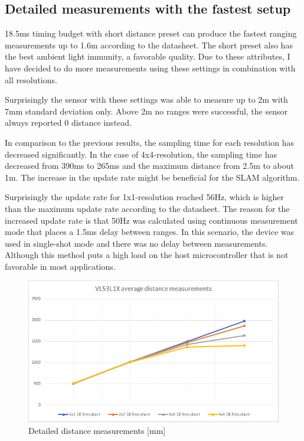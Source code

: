 \subsection{Detailed measurements with the fastest setup}
18.5ms timing budget with short distance preset can produce the fastest ranging measurements
up to 1.6m according to the datasheet. The short preset also has the best ambient light
immunity, a favorable quality. Due to these attributes, I have decided to do more measurements
using these settings in combination with all resolutions.

Surprisingly the sensor with these settings was able to measure up to 2m with 7mm
standard deviation only. Above 2m no ranges were successful, the sensor always reported 0 distance
instead.

In comparison to the previous results, the sampling time for each resolution has decreased
significantly. In the case of 4x4-resolution, the sampling time has decreased from 390ms to
265ms and the maximum distance from 2.5m to about 1m. The increase in the update rate might be
beneficial for the SLAM algorithm.

Surprisingly the update rate for 1x1-resolution reached 56Hz, which is higher than the
maximum update rate according to the datasheet. The reason for the increased update rate
is that 50Hz was calculated using continuous measurement mode that places a 1.5ms delay
between ranges. In this scenario, the device was used in single-shot mode and there was
no delay between measurements. Although this method puts a high load on the host
microcontroller that is not favorable in most applications.



\begin{figure}[!h]
    \centering
	\includegraphics[width=115mm, keepaspectratio]{figures/vl53l1x_measurements_03_dist.png}
    \caption{Detailed distance measurements [mm]}
    \label{fig:vl53l1x_meas_further_detailed_dist}
\end{figure}

